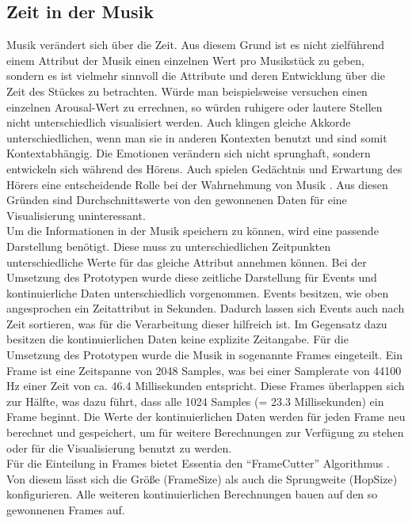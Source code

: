 \documentclass[11pt,a4paper]{article}
\begin{document}
\subsection{Zeit in der Musik}
Musik verändert sich über die Zeit. Aus diesem Grund ist es nicht zielführend einem Attribut der Musik einen einzelnen Wert pro Musikstück zu geben, sondern es ist vielmehr sinnvoll die Attribute und deren Entwicklung über die Zeit des Stückes zu betrachten. Würde man beispielsweise versuchen einen einzelnen Arousal-Wert zu errechnen, so würden ruhigere oder lautere Stellen nicht unterschiedlich visualisiert werden. Auch klingen gleiche Akkorde unterschiedlichen, wenn man sie in anderen Kontexten benutzt und sind somit Kontextabhängig. Die Emotionen verändern sich nicht sprunghaft, sondern entwickeln sich während des Hörens. Auch spielen Gedächtnis und Erwartung des Hörers eine entscheidende Rolle bei der Wahrnehmung von Musik \cite[S. 2]{8a02f9c512933d46fbea928d23ac65e38b61b88caba9b38319a5d4952b5a6667}. Aus diesen Gründen sind Durchschnittswerte von den gewonnenen Daten für eine Visualisierung uninteressant.\\
Um die Informationen in der Musik speichern zu können, wird eine passende Darstellung benötigt. Diese muss zu unterschiedlichen Zeitpunkten unterschiedliche Werte für das gleiche Attribut annehmen können. Bei der Umsetzung des Prototypen wurde diese zeitliche Darstellung für Events und kontinuierliche Daten unterschiedlich vorgenommen. Events besitzen, wie oben angesprochen ein Zeitattribut in Sekunden. Dadurch lassen sich Events auch nach Zeit sortieren, was für die Verarbeitung dieser hilfreich ist. Im Gegensatz dazu besitzen die kontinuierlichen Daten keine explizite Zeitangabe. Für die Umsetzung des Prototypen wurde die Musik in sogenannte Frames eingeteilt. Ein Frame ist eine Zeitspanne von 2048 Samples, was bei einer Samplerate von 44100 Hz einer Zeit von ca. 46.4 Millisekunden entspricht. Diese Frames überlappen sich zur Hälfte, was dazu führt, dass alle 1024 Samples (= 23.3 Millisekunden) ein Frame beginnt. Die Werte der kontinuierlichen Daten werden für jeden Frame neu berechnet und gespeichert, um für weitere Berechnungen zur Verfügung zu stehen oder für die Visualisierung benutzt zu werden.\\
Für die Einteilung in Frames bietet Essentia den ``FrameCutter'' Algorithmus \cite{EssentiaFrameCutter}. Von diesem lässt sich die Größe (FrameSize) als auch die Sprungweite (HopSize) konfigurieren. Alle weiteren kontinuierlichen Berechnungen bauen auf den so gewonnenen Frames auf.
\end{document}
